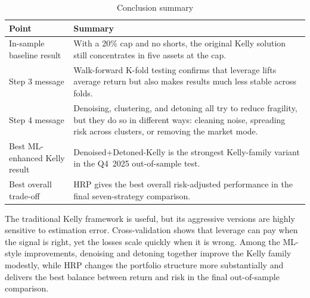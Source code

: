 \documentclass[11pt,a4paper]{article}
\begin{document}
\begin{table}[H]
\centering
\caption{Conclusion summary}
\label{tab:conclusion_summary}
{\small\setlength{\tabcolsep}{4pt}\renewcommand{\arraystretch}{1.15}\begin{tabularx}{\textwidth}{>{\raggedright\arraybackslash}p{4.0cm} X}
\toprule
Point & Summary \\
\midrule
In-sample baseline result & With a 20\% cap and no shorts, the original Kelly solution still concentrates in five assets at the cap. \\
Step 3 message & Walk-forward K-fold testing confirms that leverage lifts average return but also makes results much less stable across folds. \\
Step 4 message & Denoising, clustering, and detoning all try to reduce fragility, but they do so in different ways: cleaning noise, spreading risk across clusters, or removing the market mode. \\
Best ML-enhanced Kelly result & Denoised+Detoned-Kelly is the strongest Kelly-family variant in the Q4~2025 out-of-sample test. \\
Best overall trade-off & HRP gives the best overall risk-adjusted performance in the final seven-strategy comparison. \\
\bottomrule
\end{tabularx}}
\end{table}

The traditional Kelly framework is
useful, but its aggressive versions are highly sensitive to estimation error. Cross-validation shows
that leverage can pay when the signal is right, yet the losses scale quickly when it is wrong.
Among the ML-style improvements, denoising and detoning together improve the Kelly family
modestly, while HRP changes the portfolio structure more substantially and delivers the best
balance between return and risk in the final out-of-sample comparison.
\end{document}
